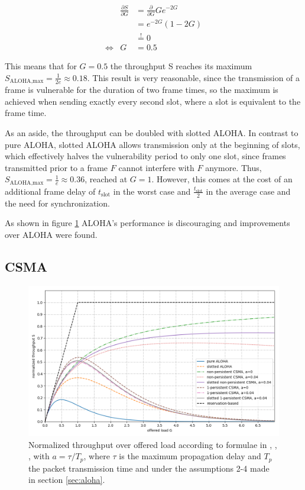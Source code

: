 \begin{eqnarray}
	& \frac{\partial S}{\partial G} & = \frac{\partial}{\partial G} Ge^{-2G} \\ 
	& & = e^{-2G}(1-2G) \\
	& & \stackrel{!}{=} 0 \\
	\Leftrightarrow & G & = 0.5
\end{eqnarray}
	
This means that for $G=0.5$ the throughput S reaches its maximum $S_\text{ALOHA,max} = \frac{1}{2e} \approx 0.18$. This result is very reasonable, since the transmission of a frame is vulnerable for the duration of two frame times, so the maximum is achieved when sending exactly every second slot, where a slot is equivalent to the frame time.

As an aside, the throughput can be doubled with slotted ALOHA. In contrast to pure ALOHA, slotted ALOHA allows transmission only at the beginning of slots, which effectively halves the vulnerability period to only one slot, since frames transmitted prior to a frame $F$ cannot interfere with $F$ anymore. Thus, $S_\text{ALOHA,max} = \frac{1}{e} \approx 0.36$, reached at $G=1$. However, this comes at the cost of an additional frame delay of $t_\text{slot}$ in the worst case and $\frac{t_\text{slot}}{2}$ in the average case and the need for synchronization. 

As shown in figure \ref{fig:aloha-csma-performance} ALOHA's performance is discouraging and improvements over ALOHA were found. 

\subsection{CSMA}

\begin{figure}[tb]
	\label{fig:aloha-csma-performance}
	\begin{center}
		\includegraphics[width=\textwidth]{pictures/aloha_csma_performance}
	\end{center}
	\caption{Normalized throughput over offered load according to formulae in \cite{Garg07}, \cite{Bachir10},  \cite{Tanenbaum02}, with $a=\tau/T_p$, where $\tau$ is the maximum propagation delay and $T_p$ the packet transmission time and under the assumptions 2-4 made in section \ref{sec:aloha}. }
\end{figure}

